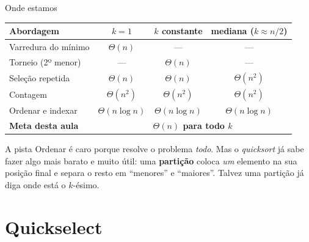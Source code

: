 \documentclass[aspectratio=169]{beamer}
\begin{document}
\begin{frame}{Onde estamos}
  \begin{center}
  \small
  \begin{tabular}{lccc}
    \toprule
    \textbf{Abordagem} & \textbf{$k=1$} & \textbf{$k$ constante} & \textbf{mediana ($k \approx n/2$)}\\
    \midrule
    Varredura do mínimo      & $\Theta(n)$ & ---          & ---\\
    Torneio (2º menor)       & ---         & $\Theta(n)$  & ---\\
    Seleção repetida         & $\Theta(n)$ & $\Theta(n)$  & $\Theta(n^2)$\\
    Contagem                 & $\Theta(n^2)$ & $\Theta(n^2)$ & $\Theta(n^2)$\\
    Ordenar e indexar        & $\Theta(n\log n)$ & $\Theta(n\log n)$ & $\Theta(n\log n)$\\
    \midrule
    \textbf{Meta desta aula} & \multicolumn{3}{c}{\textbf{$\Theta(n)$ para todo $k$}}\\
    \bottomrule
  \end{tabular}
  \end{center}

  \begin{block}{A pista}
    Ordenar é caro porque resolve o problema \emph{todo}. Mas o
    \emph{quicksort} já sabe fazer algo mais barato e muito útil: uma
    \textbf{partição} coloca \emph{um} elemento na sua posição final e separa o
    resto em ``menores'' e ``maiores''. Talvez uma partição já diga onde está o
    $k$-ésimo.
  \end{block}
\end{frame}

\section{Quickselect}
\end{document}
